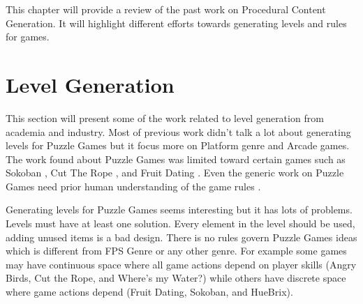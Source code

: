 This chapter will provide a review of the past work on Procedural Content Generation. It will highlight different efforts towards generating levels and rules for games.

\section{Level Generation}
This section will present some of the work related to level generation from academia and industry. Most of previous work didn't talk a lot about generating levels for Puzzle Games but it focus more on Platform genre and Arcade games. The work found about Puzzle Games was limited toward certain games such as Sokoban \cite{sokobanLevelGenerationNew, sokobanLevelGenerationOld}, Cut The Rope \cite{ctrSimulationApproach}, and Fruit Dating \cite{fruitDating}. Even the generic work on Puzzle Games need prior human understanding of the game rules \cite{ctrProgressiveApproach, ctrAutomaticGeneration}.\\\par

Generating levels for Puzzle Games seems interesting but it has lots of problems. Levels must have at least one solution. Every element in the level should be used, adding unused items is a bad design. There is no rules govern Puzzle Games ideas which is different from FPS Genre or any other genre. For example some games may have continuous space where all game actions depend on player skills (Angry Birds, Cut the Rope, and Where's my Water?) while others have discrete space where game actions depend (Fruit Dating, Sokoban, and HueBrix).

